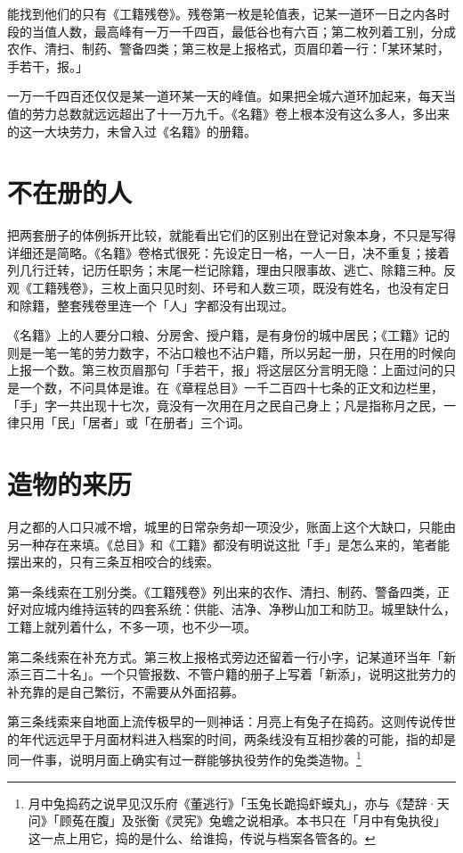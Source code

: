 能找到他们的只有《工籍残卷》。残卷第一枚是轮值表，记某一道环一日之内各时段的当值人数，最高峰有一万一千四百，最低谷也有六百；第二枚列着工别，分成农作、清扫、制药、警备四类；第三枚是上报格式，页眉印着一行：「某环某时，手若干，报。」

一万一千四百还仅仅是某一道环某一天的峰值。如果把全城六道环加起来，每天当值的劳力总数就远远超出了十一万九千。《名籍》卷上根本没有这么多人，多出来的这一大块劳力，未曾入过《名籍》的册籍。

\section{不在册的人}

把两套册子的体例拆开比较，就能看出它们的区别出在登记对象本身，不只是写得详细还是简略。《名籍》卷格式很死：先设定日一格，一人一日，决不重复；接着列几行迁转，记历任职务；末尾一栏记除籍，理由只限事故、逃亡、除籍三种。反观《工籍残卷》，三枚上面只见时刻、环号和人数三项，既没有姓名，也没有定日和除籍，整套残卷里连一个「人」字都没有出现过。

《名籍》上的人要分口粮、分房舍、授户籍，是有身份的城中居民；《工籍》记的则是一笔一笔的劳力数字，不沾口粮也不沾户籍，所以另起一册，只在用的时候向上报一个数。第三枚页眉那句「手若干，报」将这层区分言明无隐：上面过问的只是一个数，不问具体是谁。在《章程总目》一千二百四十七条的正文和边栏里，「手」字一共出现十七次，竟没有一次用在月之民自己身上；凡是指称月之民，一律只用「民」「居者」或「在册者」三个词。

\section{造物的来历}

月之都的人口只减不增，城里的日常杂务却一项没少，账面上这个大缺口，只能由另一种存在来填。《总目》和《工籍》都没有明说这批「手」是怎么来的，笔者能摆出来的，只有三条互相咬合的线索。

第一条线索在工别分类。《工籍残卷》列出来的农作、清扫、制药、警备四类，正好对应城内维持运转的四套系统：供能、洁净、净秽山加工和防卫。城里缺什么，工籍上就列着什么，不多一项，也不少一项。

第二条线索在补充方式。第三枚上报格式旁边还留着一行小字，记某道环当年「新添三百二十名」。一个只管报数、不管户籍的册子上写着「新添」，说明这批劳力的补充靠的是自己繁衍，不需要从外面招募。

第三条线索来自地面上流传极早的一则神话：月亮上有兔子在捣药。这则传说传世的年代远远早于月面材料进入档案的时间，两条线没有互相抄袭的可能，指的却是同一件事，说明月面上确实有过一群能够执役劳作的兔类造物。\footnote{月中兔捣药之说早见汉乐府《董逃行》「玉兔长跪捣虾蟆丸」，亦与《楚辞·天问》「顾菟在腹」及张衡《灵宪》兔蟾之说相承。本书只在「月中有兔执役」这一点上用它，捣的是什么、给谁捣，传说与档案各管各的。}


